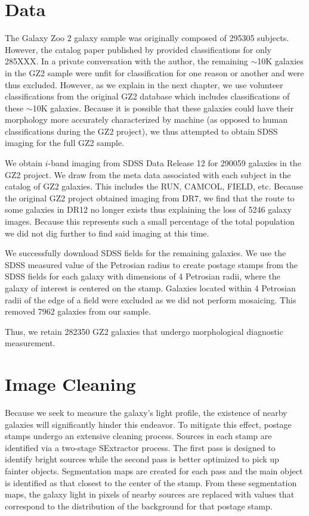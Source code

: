 \section{Data}
The Galaxy Zoo 2 galaxy sample was originally composed of 295305 subjects. However, the catalog paper published by \cite{Willett2013} provided classifications for only 285XXX. In a private conversation with the author, the remaining $\sim$10K galaxies in the GZ2 sample were unfit for classification for one reason or another and were thus excluded. However, as we explain in the next chapter, we use volunteer classifications from the original GZ2 database which includes classifications of these $\sim$10K galaxies. Because it is possible that these galaxies could have their morphology more accurately characterized by machine (as opposed to human classifications during the GZ2 project), we thus attempted to obtain SDSS imaging for the full GZ2 sample. 

We obtain $i$-band imaging from SDSS Data Release 12 for 290059 galaxies in the GZ2 project. We draw from the meta data associated with each subject in the catalog of GZ2 galaxies. This includes the RUN, CAMCOL, FIELD, etc. Because the original GZ2 project obtained imaging from DR7, we find that the route to some galaxies in DR12 no longer exists thus explaining the loss of 5246 galaxy images. Because this represents such a small percentage of the total population we did not dig further to find said imaging at this time. 

We successfully download SDSS fields for the remaining galaxies. We use the SDSS measured value of the Petrosian radius to create postage stamps from the SDSS fields for each galaxy with dimensions of 4 Petrosian radii, where the galaxy of interest is centered on the stamp. Galaxies located within 4 Petrosian radii of the edge of a field were excluded as we did not perform mosaicing. This removed 7962 galaxies from our sample.

Thus, we retain 282350 GZ2 galaxies that undergo morphological diagnostic measurement. 

\section{Image Cleaning}
Because we seek to measure the galaxy's light profile, the existence of nearby galaxies will significantly hinder this endeavor. To mitigate this effect, postage stamps undergo an extensive cleaning process. Sources in each stamp are identified via a two-stage SExtractor \citep[ver. 2.8.6;][]{sextractor} process. The first pass is designed to identify bright sources while the second pass is better optimized to pick up fainter objects. Segmentation maps are created for each pass and the main object is identified as that closest to the center of the stamp.  From these segmentation maps, the galaxy light in pixels of nearby sources are replaced with values that correspond to the distribution of the background for that postage stamp. 

